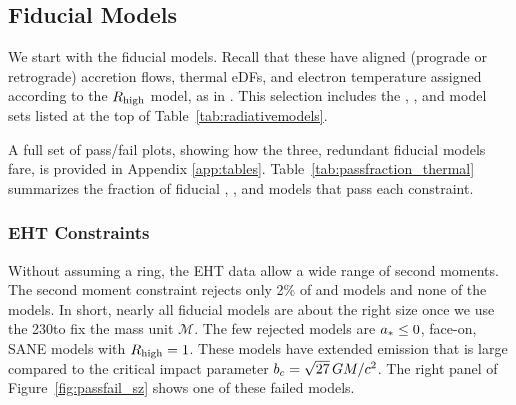
\subsection{Fiducial Models}\label{subsec:thermal}

We start with the fiducial models.
Recall that these have aligned (prograde or retrograde) accretion flows, thermal eDFs, and electron temperature assigned according to the $R_\mathrm{high}$ model, as in .
This selection includes the \kharma, \bhac, and \hamr model sets listed at the top of Table~\ref{tab:radiativemodels}.

A full set of pass/fail plots, showing how the three, redundant fiducial models fare, is provided in Appendix \ref{app:tables}.
Table~\ref{tab:passfraction_thermal} summarizes the fraction of fiducial \kharma, \bhac, and \hamr models that pass each constraint.

\subsubsection{EHT Constraints}



Without assuming a ring, the EHT data allow a wide range of second moments.
The second moment constraint rejects only 2\% of \kharma and \bhac models and none of the \hamr models.
In short, nearly all fiducial models are about the right size once we use the 230\GHz to fix the mass unit $\mathcal{M}$.
The few rejected models are $a_* \le 0$, face-on, SANE models with $R_\mathrm{high} = 1$.
These models have extended emission that is large compared to the critical impact parameter $b_c = \sqrt{27}\,GM/c^2$.
The right panel of Figure~\ref{fig:passfail_sz} shows one of these failed models.

